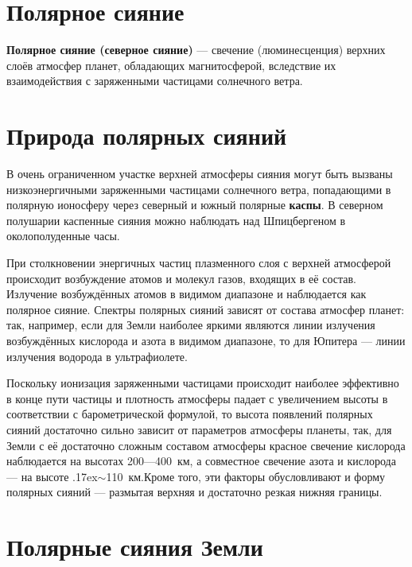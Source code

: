 \documentclass[a4paper,14pt]{article}
\newcommand{\tilda}{\raise.17ex\hbox{$\scriptstyle\sim$}}
\begin{document}
\section*{Полярное сияние} %

\textbf{Полярное сияние (северное сияние)} — свечение (люминесценция) верхних слоёв атмосфер планет, обладающих магнитосферой, вследствие их взаимодействия с заряженными частицами солнечного ветра.

\tableofcontents

\section{Природа полярных сияний}

В очень ограниченном участке верхней атмосферы сияния могут быть вызваны низкоэнергичными заряженными частицами солнечного ветра, попадающими в полярную ионосферу через северный и южный полярные \textbf{каспы}. В северном полушарии каспенные сияния можно наблюдать над Шпицбергеном в околополуденные часы. 

При столкновении энергичных частиц плазменного слоя с верхней атмосферой происходит возбуждение атомов и молекул газов, входящих в её состав. Излучение возбуждённых атомов в видимом диапазоне и наблюдается как полярное сияние. Спектры полярных сияний зависят от состава атмосфер планет: так, например, если для Земли наиболее яркими являются линии излучения возбуждённых кислорода и азота в видимом диапазоне, то для Юпитера — линии излучения водорода в ультрафиолете.

Поскольку ионизация заряженными частицами происходит наиболее эффективно в конце пути частицы и плотность атмосферы падает с увеличением высоты в соответствии с барометрической формулой, то высота появлений полярных сияний достаточно сильно зависит от параметров атмосферы планеты, так, для Земли с её достаточно сложным составом атмосферы красное свечение кислорода наблюдается на высотах 200—400~км, а совместное свечение азота и кислорода — на высоте \tilda110~км.Кроме того, эти факторы обусловливают и форму полярных сияний — размытая верхняя и достаточно резкая нижняя границы.

\section{Полярные сияния Земли}
\end{document}
